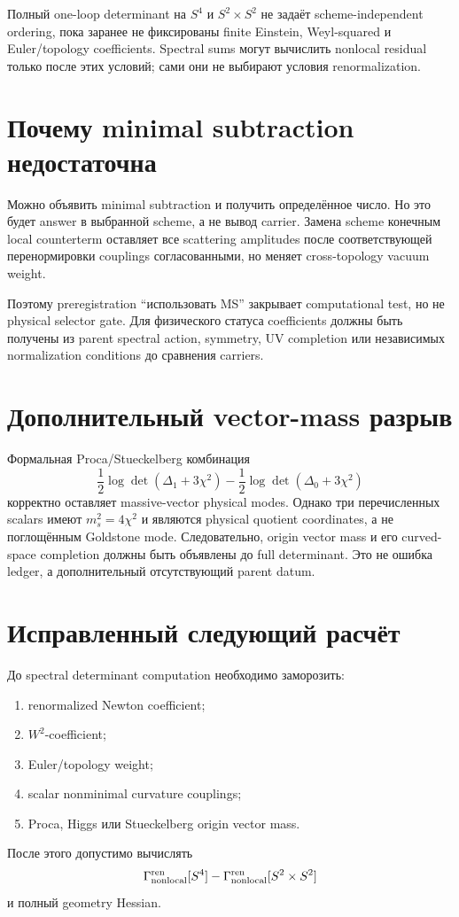 \begin{theorem}
Полный one-loop determinant на \(S^4\) и \(S^2\times S^2\) не задаёт
scheme-independent ordering, пока заранее не фиксированы finite Einstein,
Weyl-squared и Euler/topology coefficients. Spectral sums могут вычислить
nonlocal residual только после этих условий; сами они не выбирают условия
renormalization.
\end{theorem}

\section{Почему minimal subtraction недостаточна}

Можно объявить minimal subtraction и получить определённое число. Но это
будет answer в выбранной scheme, а не вывод carrier. Замена scheme конечным
local counterterm оставляет все scattering amplitudes после соответствующей
перенормировки couplings согласованными, но меняет cross-topology vacuum
weight.

Поэтому preregistration ``использовать MS'' закрывает computational test,
но не physical selector gate. Для физического статуса coefficients должны
быть получены из parent spectral action, symmetry, UV completion или
независимых normalization conditions до сравнения carriers.

\section{Дополнительный vector-mass разрыв}

Формальная Proca/Stueckelberg комбинация
\begin{equation}
 \frac12\log\det(\Delta_1+3\chi^2)
 -\frac12\log\det(\Delta_0+3\chi^2)
\end{equation}
корректно оставляет massive-vector physical modes. Однако три перечисленных
scalars имеют \(m_s^2=4\chi^2\) и являются physical quotient coordinates,
а не поглощённым Goldstone mode. Следовательно, origin vector mass и его
curved-space completion должны быть объявлены до full determinant. Это не
ошибка ledger, а дополнительный отсутствующий parent datum.

\section{Исправленный следующий расчёт}

До spectral determinant computation необходимо заморозить:
\begin{enumerate}
 \item renormalized Newton coefficient;
 \item \(W^2\)-coefficient;
 \item Euler/topology weight;
 \item scalar nonminimal curvature couplings;
 \item Proca, Higgs или Stueckelberg origin vector mass.
\end{enumerate}
После этого допустимо вычислять
\begin{equation}
 \Gamma_{\rm nonlocal}^{\rm ren}[S^4]
 -\Gamma_{\rm nonlocal}^{\rm ren}[S^2\times S^2]
\end{equation}
и полный geometry Hessian.

